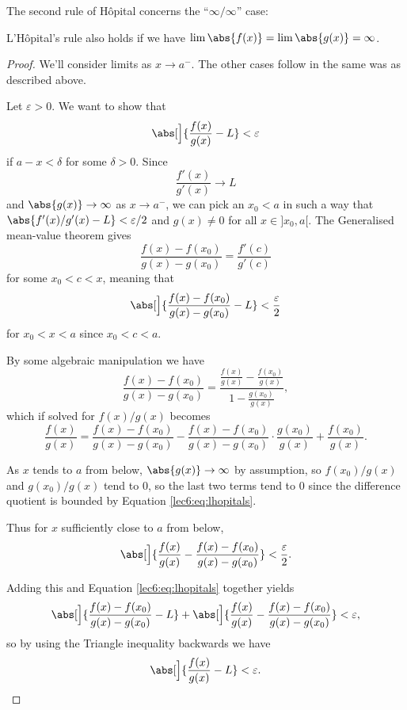 \noindent
The second rule of H\^{o}pital concerns the ``$\infty / \infty$'' case:

\begin{theorem}
	L'H\^{o}pital's rule also holds if we have $\lim \abs{f(x)} = \lim \abs{g(x)} = \infty$.
\end{theorem}

\begin{proof}
	We'll consider limits as $x \to a^-$.
	The other cases follow in the same was as described above.

	Let $\varepsilon > 0$.
	We want to show that
	\[
		\abs[\Big]{\frac{f(x)}{g(x)} - L} < \varepsilon
	\]
	if $a - x < \delta$ for some $\delta > 0$.
	Since
	\[
		\frac{f'(x)}{g'(x)} \to L
	\]
	and $\abs{g(x)} \to \infty$ as $x \to a^-$, we can pick an $x_0 < a$ in such a way that $\abs{f'(x) / g'(x) - L} < \varepsilon/2$ and $g(x) \neq 0$ for all $x \in {]{x_0, a}[}$.
	The Generalised mean-value theorem gives
	\[
		\frac{f(x) - f(x_0)}{g(x) - g(x_0)} = \frac{f'(c)}{g'(c)}
	\]
	for some $x_0 < c < x$, meaning that
	\begin{equation}\label{lec6:eq:lhopitals}
		\abs[\Big]{\frac{f(x) - f(x_0)}{g(x) - g(x_0)} - L} < \frac{\varepsilon}{2}
	\end{equation}
	for $x_0 < x < a$ since $x_0 < c < a$.

	By some algebraic manipulation we have
	\[
		\frac{f(x) - f(x_0)}{g(x) - g(x_0)} = \frac{\frac{f(x)}{g(x)} - \frac{f(x_0)}{g(x)}}{1 - \frac{g(x_0)}{g(x)}},
	\]
	which if solved for $f(x)/g(x)$ becomes
	\[
		\frac{f(x)}{g(x)} = \frac{f(x) - f(x_0)}{g(x) - g(x_0)} - \frac{f(x) - f(x_0)}{g(x) - g(x_0)} \cdot \frac{g(x_0)}{g(x)} + \frac{f(x_0)}{g(x)}.
	\]

	\noindent
	As $x$ tends to $a$ from below, $\abs{g(x)} \to \infty$ by assumption, so $f(x_0) / g(x)$ and $g(x_0) / g(x)$ tend to $0$, so the last two terms tend to $0$ since the difference quotient is bounded by Equation \eqref{lec6:eq:lhopitals}.

	Thus for $x$ sufficiently close to $a$ from below,
	\[
		\abs[\Big]{\frac{f(x)}{g(x)} - \frac{f(x) - f(x_0)}{g(x) - g(x_0)}} < \frac{\varepsilon}{2}.
	\]

	\noindent
	Adding this and Equation \eqref{lec6:eq:lhopitals} together yields
	\[
		\abs[\Big]{\frac{f(x) - f(x_0)}{g(x) - g(x_0)} - L} + \abs[\Big]{\frac{f(x)}{g(x)} - \frac{f(x) - f(x_0)}{g(x) - g(x_0)}}  < \varepsilon,
	\]
	so by using the Triangle inequality backwards we have
	\[
		\abs[\Big]{\frac{f(x)}{g(x)} - L} < \varepsilon. \qedhere
	\]
\end{proof}
